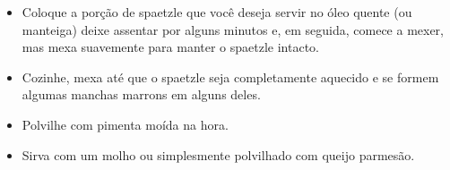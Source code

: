 \documentclass [11pt, letterpaper] {article}
\begin{document}
\begin {description}
\begin {description}
\begin {itemize}
\item Coloque a porção de spaetzle que você deseja servir no óleo quente (ou manteiga) deixe assentar por alguns minutos e, em seguida, comece a mexer, mas mexa suavemente para manter o spaetzle intacto.
\item Cozinhe, mexa até que o spaetzle seja completamente aquecido e se formem algumas manchas marrons em alguns deles.
\item Polvilhe com pimenta mo\'ida na hora.
\item Sirva com um molho ou simplesmente polvilhado com queijo parmesão.
\end {itemize}
\end {description}
\end {description}
\end{document}
